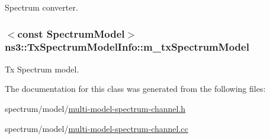 Spectrum converter. 

\subsubsection[{\texorpdfstring{m\+\_\+tx\+Spectrum\+Model}{m_txSpectrumModel}}]{$<$const {\bf Spectrum\+Model}$>$ ns3\+::\+Tx\+Spectrum\+Model\+Info\+::m\+\_\+tx\+Spectrum\+Model}\hypertarget{classns3_1_1TxSpectrumModelInfo_a1b7bb35a36d4b41d43ac47b2d8cd2388}{}\label{classns3_1_1TxSpectrumModelInfo_a1b7bb35a36d4b41d43ac47b2d8cd2388}


Tx Spectrum model. 



The documentation for this class was generated from the following files\+:\begin{DoxyCompactItemize}
\item 
spectrum/model/\hyperlink{multi-model-spectrum-channel_8h}{multi-\/model-\/spectrum-\/channel.\+h}\item 
spectrum/model/\hyperlink{multi-model-spectrum-channel_8cc}{multi-\/model-\/spectrum-\/channel.\+cc}\end{DoxyCompactItemize}
